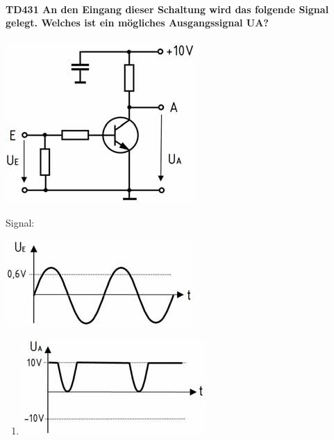 \documentclass[8pt]{article}
\begin{document}
\begin{enumerate}
\begin{enumerate}[nolistsep,label=\Alph*]
\paragraph*{TD431 An den Eingang dieser Schaltung wird das folgende Signal gelegt. Welches ist ein mögliches Ausgangssignal UA?}
\begin{center}
	\begin{minipage}{\linewidth}
		\centering
		\includegraphics[scale=1.0]{pics/td431_a.jpg}
	\end{minipage}
\end{center}
Signal:
\begin{center}
	\begin{minipage}{\linewidth}
		\centering
		\includegraphics[scale=1.0]{pics/td431_b.jpg}
	\end{minipage}
\end{center}
\begin{enumerate}[nolistsep,label=\Alph*]
\item
\begin{center}
	\begin{minipage}{\linewidth}
		\centering
		\includegraphics[scale=1.0]{pics/td431_c.jpg}
	\end{minipage}

\end{center}
\end{enumerate}
\end{enumerate}
\end{enumerate}
\end{document}
